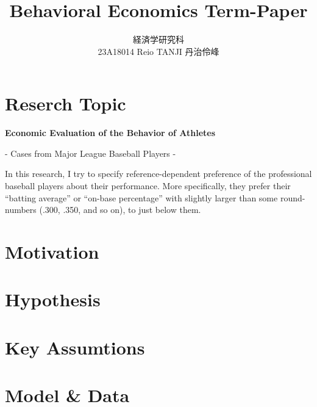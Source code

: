 \documentclass{jsarticle}[12pt]
\begin{document}
\title{Behavioral Economics Term-Paper}
\author{経済学研究科　 \\ 23A18014 Reio TANJI 丹治伶峰}
\date{}
\maketitle

\section{Reserch Topic}

\Large

\textbf{Economic Evaluation of the Behavior of Athletes}

\hspace{5zw}- Cases from Major League Baseball Players -

\large

\vspace{1zw}

\hspace{2zw}In this research, I try to specify reference-dependent preference of the professional baseball players about their performance. More specifically, they prefer their ``batting average'' or ``on-base percentage'' with slightly larger than some round-numbers (.300, .350, and so on), to just below them.

\section{Motivation}



\section{Hypothesis}



\section{Key Assumtions}



\section{Model \& Data}
\end{document}

